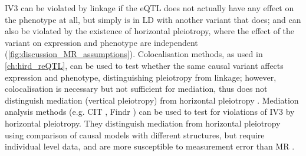 IV3 can be violated by linkage if the eQTL does not actually have any effect on the phenotype at all, 
but simply is in \gls{LD} with another variant that does;
and can also be violated by the existence of horizontal pleiotropy, 
where the effect of the variant on expression and phenotype are independent (\cref{fig:discussion_MR_assumptions}).
Colocalisation methods, as used in \cref{ch:hird_reQTL}, can be used to test whether the same causal variant affects expression and phenotype, distinguishing pleiotropy from linkage;
however, colocalisation is necessary but not sufficient for mediation,
thus does not distinguish mediation (vertical pleiotropy) from horizontal pleiotropy \autocite{hemani2018EvaluatingPotentialRole}.
%
Mediation analysis methods (e.g. CIT \autocite{millstein2009DisentanglingMolecularRelationships}, Findr \autocite{wang2017EfficientAccurateCausal}) can be used to test for violations of IV3 by horizontal pleiotropy.
They distinguish mediation from horizontal pleiotropy using comparison of causal models with different structures,
but require individual level data, and are more susceptible to measurement error than \gls{MR} \autocite{hemani2017OrientingCausalRelationship,hemani2018EvaluatingPotentialRole}.
%


